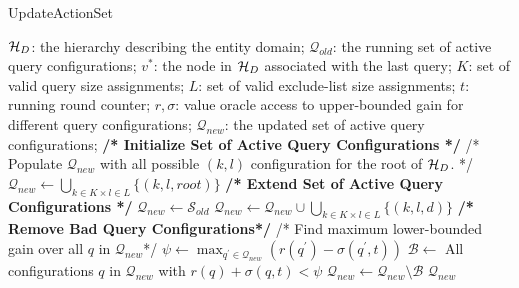 \begin{algorithm}[h]
\small\caption{UpdateActionSet}
\label{algo:updateactions}
\begin{algorithmic}[1]
 $\mathcal{H}_D$: the hierarchy describing the entity domain; $\mathcal{Q}_{old}$: the running set of active query configurations; $v^*$: the node in $\mathcal{H}_D$ associated with the last query; $K$: set of valid query size assignments; $L$: set of valid exclude-list size assignments; $t$: running round counter; $r,\sigma$: value oracle access to upper-bounded gain for different query configurations;
 $\mathcal{Q}_{new}$: the updated set of active query configurations;
	\STATE \textbf{/* Initialize Set of Active Query Configurations */}
	\STATE /* Populate ${\mathcal{Q}_{new}}$ with all possible $(k,l)$ configuration for the root of $\mathcal{H}_D$. */
	\STATE ${\mathcal{Q}_{new}} \leftarrow \bigcup_{k \in K \times l \in L} \{ (k,l,root) \}$
\ELSE
	\STATE \textbf{/* Extend Set of Active Query Configurations */}
	\STATE $\mathcal{Q}_{new} \leftarrow \mathcal{S}_{old}$
	\STATE $\mathcal{Q}_{new} \leftarrow \mathcal{Q}_{new} \cup \bigcup_{k \in K \times l \in L} \{(k,l,d)\}$
	\ENDFOR
	\STATE \textbf{/* Remove Bad Query Configurations*/}
	\STATE /* Find maximum lower-bounded gain over all $q$ in $\mathcal{Q}_{new}$*/
	\STATE $\psi \leftarrow \max_{q^{\prime} \in \mathcal{Q}_{new}} (r(q^{\prime}) - \sigma(q^{\prime},t))$  
	\STATE $\mathcal{B} \leftarrow$ All configurations $q$ in $\mathcal{Q}_{new}$ with $r(q) + \sigma(q,t) < \psi$
	\STATE $\mathcal{Q}_{new} \leftarrow \mathcal{Q}_{new} \setminus \mathcal{B}$
\ENDIF 
\RETURN $\mathcal{Q}_{new}$
\end{algorithmic}
\end{algorithm}
\vspace{-5pt}
